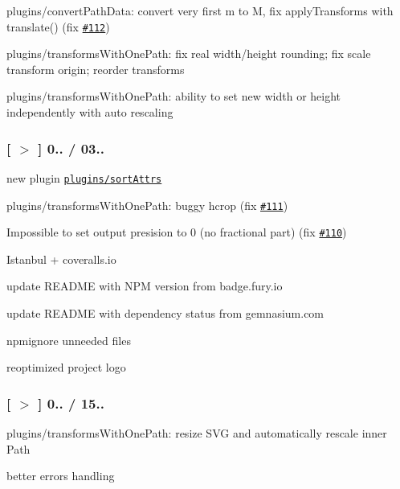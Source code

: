 \begin{DoxyItemize}
\item plugins/convert\+Path\+Data\+: convert very first m to M, fix apply\+Transforms with translate() (fix \href{https://github.com/svg/svgo/issues/112}{\tt \#112})
\item plugins/transforms\+With\+One\+Path\+: fix real width/height rounding; fix scale transform origin; reorder transforms
\item plugins/transforms\+With\+One\+Path\+: ability to set new width or height independently with auto rescaling
\end{DoxyItemize}

\subsubsection*{\mbox{[} \href{https://github.com/svg/svgo/tree/v0.3.2}{\tt $>$} \mbox{]} 0.. / 03..}


\begin{DoxyItemize}
\item new plugin \href{https://github.com/svg/svgo/blob/master/plugins/sortAttrs.js}{\tt plugins/sort\+Attrs}
\item plugins/transforms\+With\+One\+Path\+: buggy hcrop (fix \href{https://github.com/svg/svgo/issues/111}{\tt \#111})
\item Impossible to set output presision to 0 (no fractional part) (fix \href{https://github.com/svg/svgo/issues/110}{\tt \#110})
\item Istanbul + coveralls.\+io
\item update R\+E\+A\+D\+ME with N\+PM version from badge.\+fury.\+io
\item update R\+E\+A\+D\+ME with dependency status from gemnasium.\+com
\item npmignore unneeded files
\item reoptimized project logo
\end{DoxyItemize}

\subsubsection*{\mbox{[} \href{https://github.com/svg/svgo/tree/v0.3.1}{\tt $>$} \mbox{]} 0.. / 15..}


\begin{DoxyItemize}
\item plugins/transforms\+With\+One\+Path\+: resize S\+VG and automatically rescale inner Path
\item better errors handling
\end{DoxyItemize}

